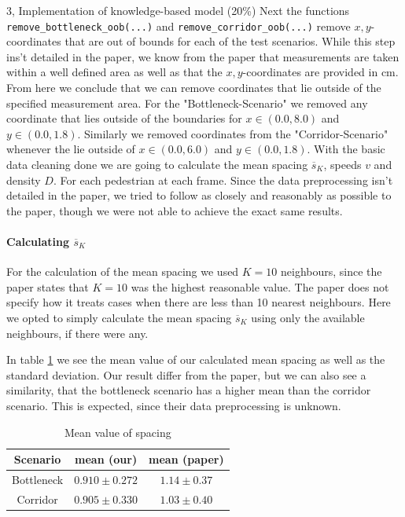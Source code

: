 \begin{task}{3, Implementation of knowledge-based model (20\%)}
Next the functions \verb|remove_bottleneck_oob(...)| and \verb|remove_corridor_oob(...)| remove $x,y$-coordinates that are out of bounds for each of the test scenarios. While this step ins't detailed in the paper, we know from the paper that measurements are taken within a well defined area as well as that the $x,y$-coordinates are provided in cm. From here we  conclude that we can remove coordinates that lie outside of the specified measurement area. For the "Bottleneck-Scenario" we removed any coordinate that lies outside of the boundaries for $x\in (0.0,8.0)$ and $y\in (0.0, 1.8)$. Similarly we removed coordinates from the "Corridor-Scenario" whenever the lie outside of $x\in (0.0,6.0)$ and $y\in (0.0, 1.8)$. With the basic data cleaning done we are going to calculate the mean spacing $\overline{s}_K$, speeds $v$ and density $D$. For each pedestrian at each frame. Since the data preprocessing isn't detailed in the paper\cite{tordeux2020prediction}, we tried to follow as closely and reasonably as possible to the paper, though we were not able to achieve the exact same results.

\paragraph{Calculating $\overline{s}_K$} For the calculation of the mean spacing we used $K=10$ neighbours, since the paper states that $K=10$ was the highest reasonable value. The paper does not specify how it treats cases when there are less than 10 nearest neighbours. Here we opted to simply calculate the mean spacing $\overline{s}_K$ using only the available neighbours, if there were any.

In table \ref{Tab:ms} we see the mean value of our calculated mean spacing as well as the standard deviation. Our result differ from the paper\cite{tordeux2020prediction}, but we can also see a similarity, that the bottleneck scenario has a higher mean than the corridor scenario. This is expected, since their data preprocessing is unknown.

\begin{table}[H]
\centering
\begin{tabular}{ |c|c|c| }
\hline
Scenario & mean (our) & mean (paper)\\
\hline
Bottleneck & $0.910\pm 0.272$ & $1.14\pm 0.37$\\
\hline
Corridor & $0.905\pm 0.330$ & $1.03\pm 0.40$\\
\hline
\end{tabular}
\caption{Mean value of spacing}
\label{Tab:ms}
\end{table}


\end{task}

